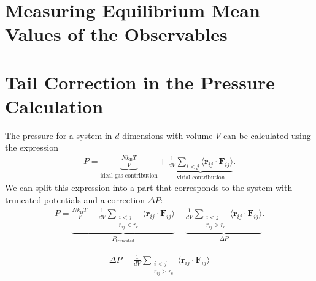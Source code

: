 \documentclass[a4paper,10pt,bibtotoc]{scrartcl}
\begin{document}
\section{Measuring Equilibrium Mean Values of the Observables}
\section{Tail Correction in the Pressure Calculation}
The pressure for a system in $d$ dimensions with volume $V$ can be calculated using the expression
\begin{align}
P = \underbrace{\frac{Nk_\mathrm{B}T}{V}}_{\text{ideal gas contribution}} + \underbrace{\frac{1}{dV}\sum_{i<j}\langle\mathbf{r}_{ij}\cdot\mathbf{F}_{ij}\rangle}_{\text{virial contribution}}.
\end{align}
We can split this expression into a part that corresponds to the system with truncated potentials and a correction $\Delta P$:
\begin{align}
P = \underbrace{\frac{Nk_\mathrm{B}T}{V} + \frac{1}{dV}\sum_{\substack{i<j\\ r_{ij}<r_\mathrm{c}}}\langle\mathbf{r}_{ij}\cdot\mathbf{F}_{ij}\rangle}_{P_\text{truncated}} + \underbrace{\frac{1}{dV}\sum_{\substack{i<j\\ r_{ij}>r_\mathrm{c}}}\langle\mathbf{r}_{ij}\cdot\mathbf{F}_{ij}\rangle}_{\Delta P}.
\end{align}

\begin{align}
\Delta P = \frac{1}{dV}\sum_{\substack{i<j\\ r_{ij}>r_\mathrm{c}}}\langle\mathbf{r}_{ij}\cdot\mathbf{F}_{ij}\rangle
\end{align}
\end{document}
